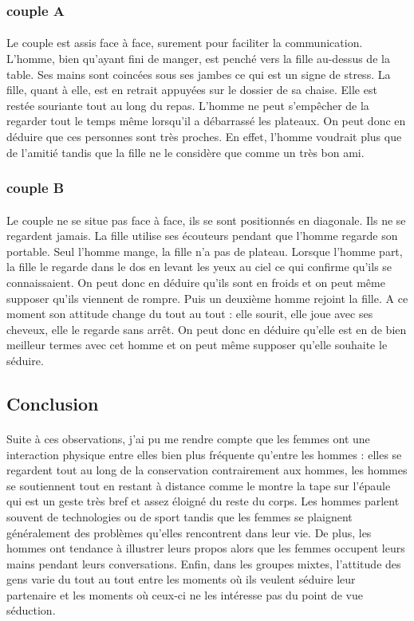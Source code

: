 \subsubsection{couple A}
\paragraph{}
Le couple est assis face à face, surement pour faciliter la communication. L’homme, bien qu’ayant fini de manger, est penché vers la fille au-dessus de la table. Ses mains sont coincées sous ses jambes ce qui est un signe de stress. La fille, quant à elle, est en retrait appuyées sur le dossier de sa chaise. Elle est restée souriante tout au long du repas. L’homme ne peut s’empêcher de la regarder tout le temps même lorsqu’il a débarrassé les plateaux. On peut donc en déduire que ces personnes sont très proches. En effet, l’homme voudrait plus que de l’amitié tandis que la fille ne le considère que comme un très bon ami.  
\subsubsection{couple B}
\paragraph{}
	Le couple ne se situe pas face à face, ils se sont positionnés en diagonale. Ils ne se regardent jamais. La fille utilise ses écouteurs pendant que l’homme regarde son portable. Seul l’homme mange, la fille n’a pas de plateau. Lorsque l’homme part, la fille le regarde dans le dos en levant les yeux au ciel ce qui confirme qu’ils se connaissaient. On peut donc en déduire qu’ils sont en froids et on peut même supposer qu’ils viennent de rompre. Puis un deuxième homme rejoint la fille. A ce moment son attitude change du tout au tout : elle sourit, elle joue avec ses cheveux, elle le regarde sans arrêt. On peut donc en déduire qu’elle est en de bien meilleur termes avec cet homme et on peut même supposer qu’elle souhaite le séduire.
	
\subsection{Conclusion}
\paragraph{}
Suite à ces observations, j’ai pu me rendre compte que les femmes ont une interaction physique entre elles bien plus fréquente qu’entre les hommes : elles se regardent tout au long de la conservation contrairement aux hommes, les hommes se soutiennent tout en restant à distance comme le montre la tape sur l’épaule qui est un geste très bref et assez éloigné du reste du corps. Les hommes parlent souvent de technologies ou de sport tandis que les femmes se plaignent généralement des problèmes qu’elles rencontrent dans leur vie. De plus, les hommes ont tendance à illustrer leurs propos alors que les femmes occupent leurs mains pendant leurs conversations. Enfin, dans les groupes mixtes, l’attitude des gens varie du tout au tout entre les moments où ils veulent séduire leur partenaire et les moments où ceux-ci ne les intéresse pas du point de vue séduction.
